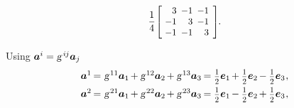 \begin{otherlanguage}{russian}
\begin{tcolorbox}
\[\begin{array}{c}
\displaystyle \frac{1}{4} \hspace{.12ex}
\scalebox{0.92}[0.92]{$\left[\hspace{-0.4ex}\begin{array}{r@{\hspace{.5em}}r@{\hspace{.5em}}r}
3 & -1 & -1 \\
-1 & 3 & -1 \\
-1 & -1 & 3
\end{array}\hspace{-0.12ex}\right]^{\mathstrut}$} \hspace{-0.25ex}.
\end{array}\]

\vspace{-0.5em}Using ${\bm{a}^i = \textsl{g}^{\hspace{.32ex}i\hspace{-0.1ex}j} \bm{a}_j}$
\[\begin{array}{l}
\bm{a}^1 \hspace{-0.2ex}=\hspace{.1ex} \textsl{g}^{\hspace{.2ex}11} \bm{a}_1 \hspace{-0.2ex} + \textsl{g}^{\hspace{.2ex}12} \bm{a}_2 \hspace{-0.2ex} + \textsl{g}^{\hspace{.2ex}13} \bm{a}_3 \hspace{-0.2ex} = \smalldisplaystyleonehalf \bm{e}_1 \hspace{-0.2ex} + \smalldisplaystyleonehalf \bm{e}_2 \hspace{-0.2ex} - \smalldisplaystyleonehalf \bm{e}_3 \hspace{.1ex},\\[.5em]
%
\bm{a}^2 \hspace{-0.2ex}=\hspace{.1ex} \textsl{g}^{\hspace{.2ex}21} \bm{a}_1 \hspace{-0.2ex} + \textsl{g}^{\hspace{.2ex}22} \bm{a}_2 \hspace{-0.2ex} + \textsl{g}^{\hspace{.2ex}23} \bm{a}_3 \hspace{-0.2ex} = \smalldisplaystyleonehalf \bm{e}_1 \hspace{-0.2ex} - \smalldisplaystyleonehalf \bm{e}_2 \hspace{-0.2ex} + \smalldisplaystyleonehalf \bm{e}_3 \hspace{.1ex},\\[.5em]

\end{array}\]
\end{tcolorbox}
\end{otherlanguage}
